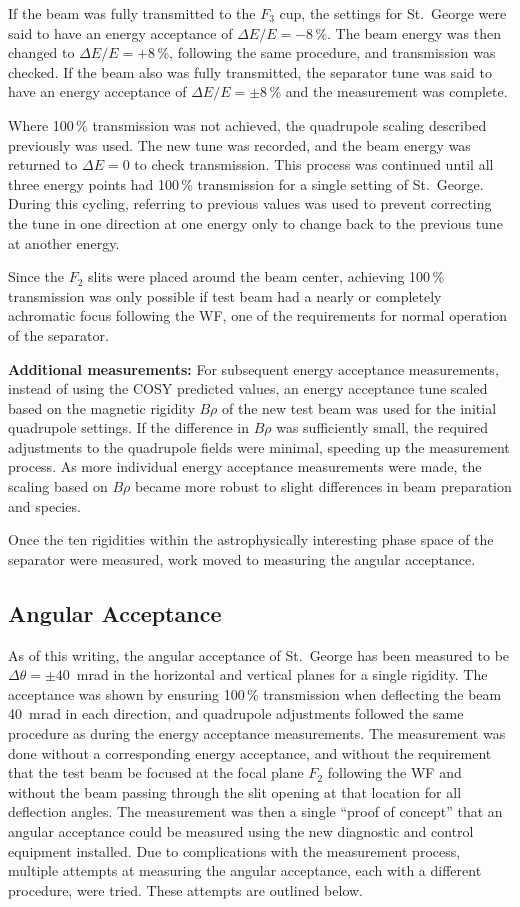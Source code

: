 If the beam was fully transmitted to the $F_3$ cup, the settings for St.\
George were said to have an energy acceptance of $\Delta E/E = -8$\,\%. The beam
energy was then changed to $\Delta E/E = + 8$\,\%, following the same procedure,
and transmission was checked. If the beam also was fully transmitted, the
separator tune was said to have an energy acceptance of $\Delta E/E = \pm 8$\,\%
and the measurement was complete.

Where 100\,\% transmission was not achieved, the quadrupole scaling described
previously was used. The new tune was recorded, and the beam energy was
returned to $\Delta E = 0$ to check transmission. This process was continued
until all three energy points had 100\,\% transmission for a single setting of
St.\ George. During this cycling, referring to previous values was used to
prevent correcting the tune in one direction at one energy only to change back
to the previous tune at another energy.

Since the $F_2$ slits were placed around the beam center, achieving 100\,\%
transmission was only possible if test beam had a nearly or completely
achromatic focus following the WF, one of the requirements for normal
operation of the separator.

\textbf{Additional measurements:}
For subsequent energy acceptance measurements, instead of using the COSY
predicted values, an energy acceptance tune scaled based on the magnetic
rigidity $B\rho$ of the new test beam was used for the initial quadrupole
settings. If the difference in $B\rho$ was sufficiently small, the required
adjustments to the quadrupole fields were minimal, speeding up the measurement
process. As more individual energy acceptance measurements were made, the
scaling based on $B\rho$ became more robust to slight differences in beam
preparation and species.

Once the ten rigidities within the astrophysically interesting phase space of
the separator were measured, work moved to measuring the angular acceptance.


\subsection{Angular Acceptance}

As of this writing, the angular acceptance of St.\ George has been measured to
be $\Delta\theta = \pm 40$~mrad in the horizontal and vertical planes for a
single rigidity. The acceptance was shown by ensuring 100\,\% transmission
when deflecting the beam 40~mrad in each direction, and quadrupole adjustments
followed the same procedure as during the energy acceptance measurements. The
measurement was done without a corresponding energy acceptance, and without the
requirement that the test beam be focused at the focal plane $F_2$ following
the WF and without the beam passing through the slit opening at that
location for all deflection angles. The measurement was then a single ``proof
of concept'' that an angular acceptance could be measured using the new
diagnostic and control equipment installed. Due to complications with the
measurement process, multiple attempts at measuring the angular acceptance,
each with a different procedure, were tried. These attempts are outlined below.

